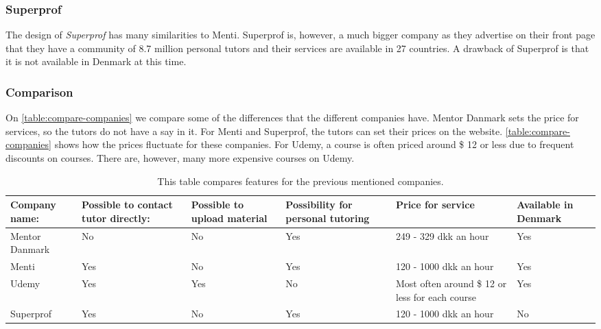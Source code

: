 \subsubsection{Superprof}
The design of \textit{Superprof} has many similarities to Menti.
Superprof is, however, a much bigger company as they advertise on their front page that they have a community of 8.7 million personal tutors \cite{superprof} and their services are available in 27 countries.
A drawback of Superprof is that it is not available in Denmark at this time.

\subsubsection{Comparison}
On \autoref{table:compare-companies} we compare some of the differences that the different companies have.
Mentor Danmark sets the price for services, so the tutors do not have a say in it.
For Menti and Superprof, the tutors can set their prices on the website. 
\autoref{table:compare-companies} shows how the prices fluctuate for these companies.
For Udemy, a course is often priced around \$ 12 or less due to frequent discounts on courses.
There are, however, many more expensive courses on Udemy.

\begin{table}[h]
    \begin{tabular}{|p{2cm}|p{2cm}|p{2cm}|p{2cm}|p{2cm}|p{2cm}|}
    \hline
    Company name:  & Possible to contact tutor directly: & Possible to upload material & Possibility for personal tutoring & Price for service                               & Available in Denmark \\ \hline
    Mentor Danmark & No                                  & No                          & Yes                               & 249 - 329 dkk an hour                           & Yes                  \\ \hline
    Menti          & Yes                                 & No                          & Yes                               & 120 - 1000 dkk an hour                          & Yes                  \\ \hline
    Udemy          & Yes                                 & Yes                         & No                                & Most often around \$ 12 or less for each course & Yes                  \\ \hline
    Superprof      & Yes                                 & No                          & Yes                               & 120 - 1000 dkk an hour                          & No                   \\ \hline
    \end{tabular}
    \caption{This table compares features for the previous mentioned companies.}
    \label{table:compare-companies}
\end{table}
 